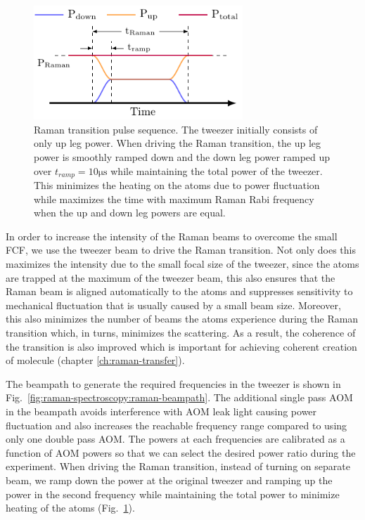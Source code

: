 \begin{figure}
  \centering
  \includegraphics[width=0.7\textwidth]{figures/raman_spectroscopy_sequence.pdf}
  \caption[Raman transition sequence]{
    Raman transition pulse sequence.
    The tweezer initially consists of only up leg power.
    When driving the Raman transition, the up leg power is smoothly ramped down and
    the down leg power ramped up over $t_{ramp}=10\mathrm{\mu s}$
    while maintaining the total power of the tweezer.
    This minimizes the heating on the atoms due to power fluctuation while maximizes the time
    with maximum Raman Rabi frequency when the up and down leg powers are equal.
    \label{fig:raman-spectroscopy:sequence}}
\end{figure}

In order to increase the intensity of the Raman beams to overcome the small FCF,
we use the tweezer beam to drive the Raman transition.
Not only does this maximizes the intensity due to the small focal size of the tweezer,
since the atoms are trapped at the maximum of the tweezer beam,
this also ensures that the Raman beam is aligned automatically to the atoms
and suppresses sensitivity to mechanical fluctuation that is usually
caused by a small beam size.
Moreover, this also minimizes the number of beams the atoms experience
during the Raman transition which, in turns, minimizes the scattering.
As a result, the coherence of the transition is also improved
which is important for achieving coherent creation of molecule
(chapter \ref{ch:raman-transfer}).

The beampath to generate the required frequencies in the tweezer is shown in
Fig.~\ref{fig:raman-spectroscopy:raman-beampath}.
The additional single pass AOM in the beampath avoids interference
with AOM leak light causing power fluctuation and
also increases the reachable frequency range compared to using only one double pass AOM.
The powers at each frequencies are calibrated as a function of AOM powers
so that we can select the desired power ratio during the experiment.
When driving the Raman transition, instead of turning on separate beam,
we ramp down the power at the original tweezer and ramping up the power
in the second frequency while maintaining the total power to minimize heating of the atoms
(Fig.~\ref{fig:raman-spectroscopy:sequence}).

